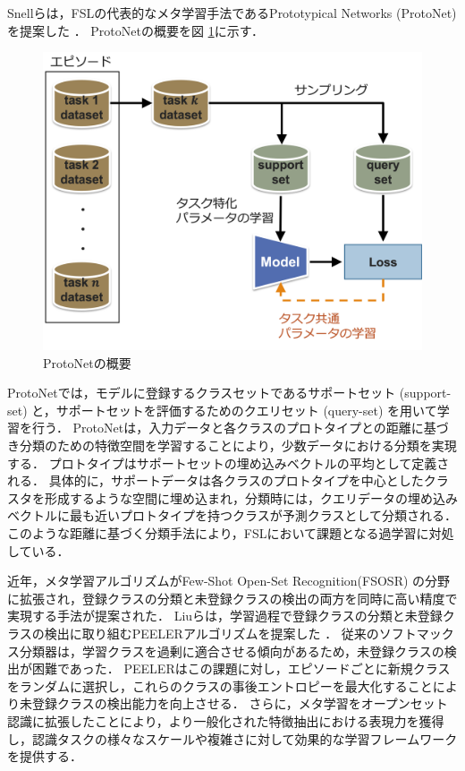 \documentclass[a4paper,11pt,nomag]{jsreport}
\begin{document}
Snellらは，FSLの代表的なメタ学習手法であるPrototypical Networks (ProtoNet) を提案した \cite{protonet}．
ProtoNetの概要を図 \ref{fig:protonet}に示す．
% 
\begin{figure}[tbp]
  \centering
  \includegraphics[width=0.7\linewidth, keepaspectratio]{image/protonet.png}
  \caption{ProtoNetの概要}
  \label{fig:protonet}
\end{figure}
% 
ProtoNetでは，モデルに登録するクラスセットであるサポートセット (support-set) と，サポートセットを評価するためのクエリセット (query-set) を用いて学習を行う．
ProtoNetは，入力データと各クラスのプロトタイプとの距離に基づき分類のための特徴空間を学習することにより，少数データにおける分類を実現する．
プロトタイプはサポートセットの埋め込みベクトルの平均として定義される．
具体的に，サポートデータは各クラスのプロトタイプを中心としたクラスタを形成するような空間に埋め込まれ，分類時には，クエリデータの埋め込みベクトルに最も近いプロトタイプを持つクラスが予測クラスとして分類される．
このような距離に基づく分類手法により，FSLにおいて課題となる過学習に対処している．

近年，メタ学習アルゴリズムがFew-Shot Open-Set Recognition(FSOSR) の分野に拡張され，登録クラスの分類と未登録クラスの検出の両方を同時に高い精度で実現する手法が提案された．
Liuらは，学習過程で登録クラスの分類と未登録クラスの検出に取り組むPEELERアルゴリズムを提案した \cite{peeler}．
従来のソフトマックス分類器は，学習クラスを過剰に適合させる傾向があるため，未登録クラスの検出が困難であった．
PEELERはこの課題に対し，エピソードごとに新規クラスをランダムに選択し，これらのクラスの事後エントロピーを最大化することにより未登録クラスの検出能力を向上させる．
さらに，メタ学習をオープンセット認識に拡張したことにより，より一般化された特徴抽出における表現力を獲得し，認識タスクの様々なスケールや複雑さに対して効果的な学習フレームワークを提供する．
\end{document}
